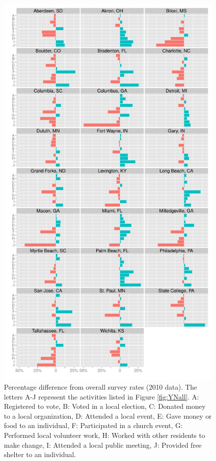 \documentclass[smallextended]{svjour3}\usepackage[]{graphicx}\usepackage[]{color}
\newenvironment{knitrout}{}{} %
\begin{document}
\begin{knitrout}
\color{fgcolor}\begin{figure}

{\centering \includegraphics[width=0.99\linewidth]{figure/YN2010plot-1} 

}

\caption{Percentage difference from overall survey rates (2010 data). The letters A-J represent the activities listed in Figure \ref{fig:YNall}. A: Registered to vote, B: Voted in a local election, C: Donated money to a local organization, D: Attended a local event, E: Gave money or food to an individual, F: Participated in a church event, G: Performed local volunteer work, H: Worked with other residents to make change, I: Attended a local public meeting, J: Provided free shelter to an individual.}\label{fig:YN2010plot}
\end{figure}


\end{knitrout}
\end{document}
